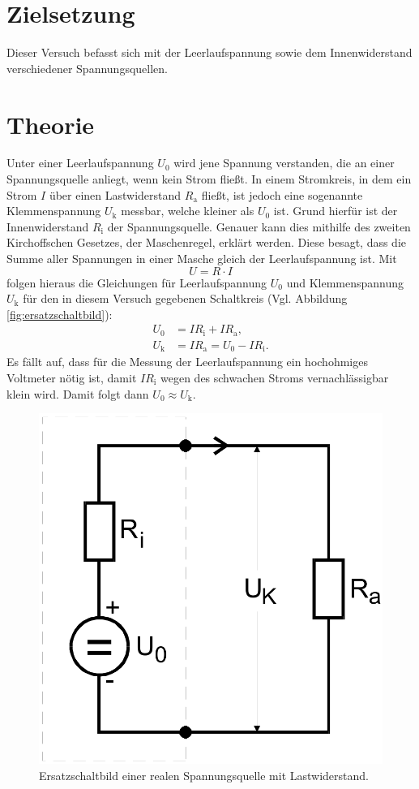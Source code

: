 \section{Zielsetzung}
Dieser Versuch befasst sich mit der Leerlaufspannung sowie dem Innenwiderstand verschiedener Spannungsquellen.
\section{Theorie}
Unter einer Leerlaufspannung $U_0$ wird jene Spannung verstanden, die an einer Spannungsquelle anliegt, wenn kein Strom fließt. In einem Stromkreis, in dem ein Strom $I$ über einen Lastwiderstand $R_{\text{a}}$ fließt, ist 
jedoch eine sogenannte Klemmenspannung $U_{\text{k}}$ messbar, welche kleiner als $U_0$ ist. Grund hierfür ist der Innenwiderstand $R_{\text{i}}$ der Spannungsquelle. Genauer kann dies mithilfe des zweiten Kirchoffschen Gesetzes,
der Maschenregel, erklärt werden. Diese besagt, dass die Summe aller Spannungen in einer Masche gleich der Leerlaufspannung ist. Mit
   \begin{equation*}
   U = R\cdot I
   \end{equation*}
folgen hieraus die Gleichungen für Leerlaufspannung $U_0$ und Klemmenspannung $U_{\text{k}}$ für den in diesem Versuch gegebenen Schaltkreis (Vgl. Abbildung \eqref{fig:ersatzschaltbild}):
   \begin{equation*}
   \begin{aligned}
   U_0 &= IR_{\text{i}} + IR_{\text{a}}, \\
   U_{\text{k}} &= IR_{\text{a}} = U_0 - IR_{\text{i}}.
   \end{aligned}
   \end{equation*}
Es fällt auf, dass für die Messung der Leerlaufspannung ein hochohmiges Voltmeter nötig ist, damit $IR_{\text{i}}$ wegen des schwachen Stroms vernachlässigbar klein wird. Damit folgt dann $U_0 \approx U_{\text{k}}$.
 \begin{figure}[h!]
   \centering
   \includegraphics[width=0.4\linewidth]{ersatzschaltbild.png}
   \caption{Ersatzschaltbild einer realen Spannungsquelle mit Lastwiderstand.}
   \label{fig:ersatzschaltbild}
   \end{figure}

